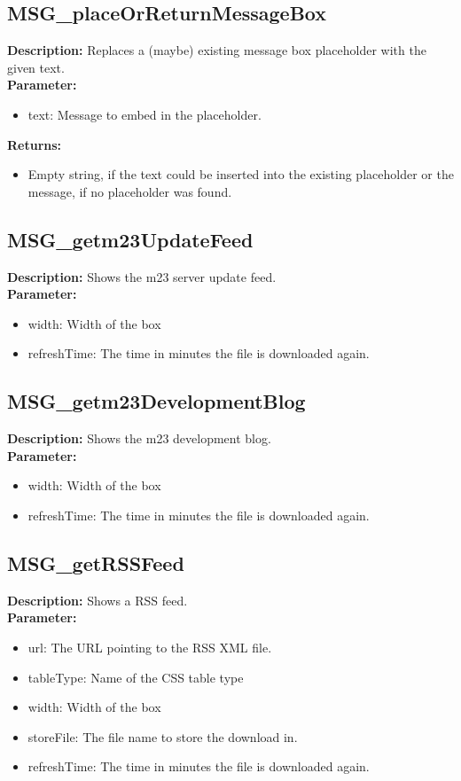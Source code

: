 \subsection{MSG\_placeOrReturnMessageBox}
\textbf{Description:} Replaces a (maybe) existing message box placeholder with the given text.\\
\textbf{Parameter:}
\begin{itemize}
\item text: Message to embed in the placeholder.
\end{itemize}
\textbf{Returns:}
\begin{itemize}
\item Empty string, if the text could be inserted into the existing placeholder or the message, if no placeholder was found.
\end{itemize}

\subsection{MSG\_getm23UpdateFeed}
\textbf{Description:} Shows the m23 server update feed.\\
\textbf{Parameter:}
\begin{itemize}
\item width: Width of the box
\item refreshTime: The time in minutes the file is downloaded again.
\end{itemize}

\subsection{MSG\_getm23DevelopmentBlog}
\textbf{Description:} Shows the m23 development blog.\\
\textbf{Parameter:}
\begin{itemize}
\item width: Width of the box
\item refreshTime: The time in minutes the file is downloaded again.
\end{itemize}

\subsection{MSG\_getRSSFeed}
\textbf{Description:} Shows a RSS feed.\\
\textbf{Parameter:}
\begin{itemize}
\item url: The URL pointing to the RSS XML file.
\item tableType: Name of the CSS table type
\item width: Width of the box
\item storeFile: The file name to store the download in.
\item refreshTime: The time in minutes the file is downloaded again.
\end{itemize}

